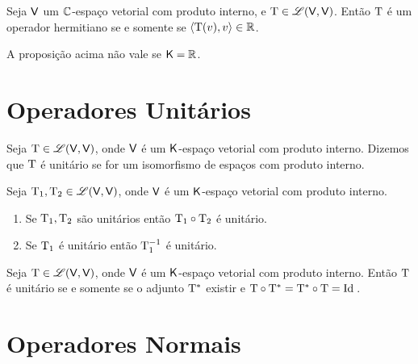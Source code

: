 \documentclass[10pt,a4paper]{book}
\begin{document}
\begin{proposition}
	Seja $\mathsf{ V }$ um $\mathbb{ C }$-espaço vetorial com produto interno, e $\mathrm{ T } \in \mathscr{ L }(\mathsf{ V }, \mathsf{ V })$. Então $\mathrm{ T }$ é um operador hermitiano se e somente se $\langle \mathrm{ T }(v), v \rangle \in \mathbb{ R }$.
\end{proposition}

\begin{remark}
	A proposição acima não vale se $\mathsf{ K } = \mathbb{ R }$.
\end{remark}



\section{Operadores Unitários}

\begin{definition}
	Seja $\mathrm{ T } \in \mathscr{ L }(\mathsf{ V }, \mathsf{ V })$, onde $\mathsf{ V }$ é um $\mathsf{ K }$-espaço vetorial com produto interno. Dizemos que $\mathrm{ T }$ é unitário se for um isomorfismo de espaços com produto interno.
\end{definition}

\begin{lemma}
	Seja $\mathrm{ T }_1, \mathrm{ T }_2 \in \mathscr{ L }(\mathsf{ V }, \mathsf{ V })$, onde $\mathsf{ V }$ é um $\mathsf{ K }$-espaço vetorial com produto interno.
	\begin{enumerate}
		\item Se $\mathrm{ T }_1, \mathrm{ T }_2$ são unitários então $\mathrm{ T }_1 \circ \mathrm{ T }_2$ é unitário.
		\item Se $\mathrm{ T }_1$ é unitário então $\mathrm{ T }_1^{-1}$ é unitário.
	\end{enumerate}
\end{lemma}

\begin{proposition}
	Seja $\mathrm{ T } \in \mathscr{ L }(\mathsf{ V }, \mathsf{ V })$, onde $\mathsf{ V }$ é um $\mathsf{ K }$-espaço vetorial com produto interno. Então $\mathrm{ T }$ é unitário se e somente se o adjunto $\mathrm{ T ^ *}$ existir e $\mathrm{ T } \circ \mathrm{ T ^ *} = \mathrm{ T ^ *} \circ \mathrm{ T } = \mathrm{ Id }\,$.
\end{proposition}



\section{Operadores Normais}
\end{document}
